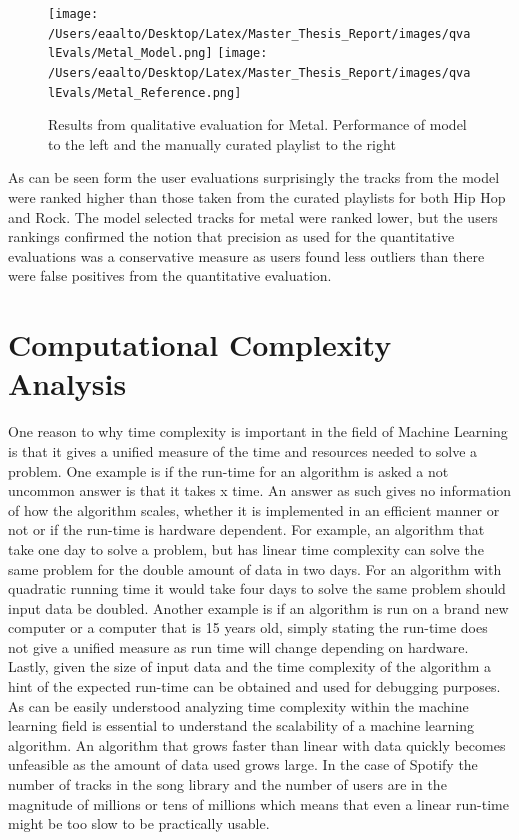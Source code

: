 \documentclass[a4paper,11pt]{kth-mag}
\begin{document}
\begin{figure}
\texttt{[image: /Users/eaalto/Desktop/Latex/Master\_Thesis\_Report/images/qvalEvals/Metal\_Model.png]}
\texttt{[image: /Users/eaalto/Desktop/Latex/Master\_Thesis\_Report/images/qvalEvals/Metal\_Reference.png]}
\caption{Results from qualitative evaluation for Metal. Performance of model to the left and the manually curated playlist to the right}
\end{figure}

As can be seen form the user evaluations surprisingly the tracks from the model were ranked higher than those taken from the curated playlists for both Hip Hop and Rock. The model selected tracks for metal were ranked lower, but the users rankings confirmed the notion that precision as used for the quantitative evaluations was a conservative measure as users found less outliers than there were false positives from the quantitative evaluation.

\chapter{Computational Complexity Analysis}
One reason to why time complexity is important in the field of Machine Learning is that it gives a unified measure of the time and resources needed to solve a problem. One example is if the run-time for an algorithm is asked a not uncommon answer is that it takes x time. An answer as such gives no information of how the algorithm scales, whether it is implemented in an efficient manner or not or if the run-time is hardware dependent. For example, an algorithm that take one day to solve a problem, but has linear time complexity can solve the same problem for the double amount of data in two days. For an algorithm with quadratic running time it would take four days to solve the same problem should input data be doubled. Another example is if an algorithm is run on a brand new computer or a computer that is 15 years old, simply stating the run-time does not give a unified measure as run time will change depending on hardware. Lastly, given the size of input data and the time complexity of the algorithm a hint of the expected run-time can be obtained and used for debugging purposes.
 As can be easily understood analyzing time complexity within the machine learning field is essential to understand the scalability of a machine learning algorithm. An algorithm that grows faster than linear with data quickly becomes unfeasible as the amount of data used grows large. In the case of Spotify the number of tracks in the song library and the number of users are in the magnitude of millions or tens of millions which means that even a linear run-time might be too slow to be practically usable.
 
\end{document}
